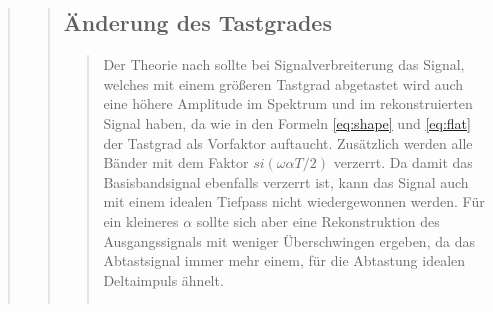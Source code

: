 \begin{quote}
\begin{quote}
\begin{quote}
          
            
          
        \end{quote}
        
        
        \subsection{Änderung des Tastgrades}
        \begin{quote}
             
             Der Theorie nach sollte bei Signalverbreiterung das Signal, welches mit einem größeren Tastgrad abgetastet
             wird auch eine höhere Amplitude im Spektrum und im rekonstruierten Signal haben, da wie in den Formeln \ref{eq:shape} und
             \ref{eq:flat} der Tastgrad als Vorfaktor auftaucht. Zusätzlich werden alle Bänder mit dem Faktor
             $si(\omega \alpha T/2)$ verzerrt. Da damit das Basisbandsignal ebenfalls verzerrt ist, kann das Signal auch mit einem idealen
             Tiefpass nicht wiedergewonnen werden. Für ein kleineres $\alpha$ sollte sich aber eine
             Rekonstruktion des Ausgangssignals mit weniger Überschwingen ergeben, da das Abtastsignal immer mehr einem,
             für die Abtastung idealen Deltaimpuls ähnelt.\\
             
            \begin{center}
            \begin{tabular}{ll}
            

\end{tabular}
\end{center}
\end{quote}
\end{quote}
\end{quote}
